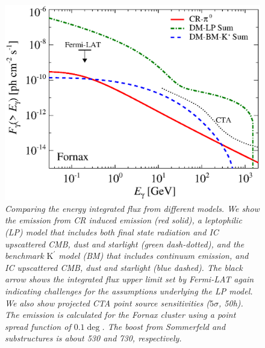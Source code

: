 \documentclass[10pt,aps,pra,reprint,amsmath,amsfonts,amssymb,showpacs,nofootinbib,floatfix]{revtex4-1}
\newcommand{\rmn}{\mathrm}
\newcommand{\Kp}{\rmn{K}^\prime}
\begin{document}
\begin{figure}
 \includegraphics[width=0.99\columnwidth]{figures/flux.int.v13.0.1deg.1.6T.SubMass.SF700.IR2.noMW.woGal.eps}
 \caption{\it Comparing the energy integrated flux from different
   models. We show the emission from CR induced emission (red solid),
   a leptophilic (LP) model that includes both final state radiation
   and IC upscattered CMB, dust and starlight (green dash-dotted), and
   the benchmark $\Kp$ model (BM) that includes continuum emission, and
   IC upscattered CMB, dust and starlight (blue dashed). The black
   arrow shows the integrated flux upper limit set by Fermi-LAT again
   indicating challenges for the assumptions underlying the LP
   model. We also show projected CTA point source sensitivities
   ($5\sigma$, 50h). The emission is calculated for the Fornax cluster
   using a point spread function of $0.1\deg$. The boost from
   Sommerfeld and substructures is about 530 and 730, respectively.}
 \label{fig:flux_int}
\end{figure}
\end{document}

